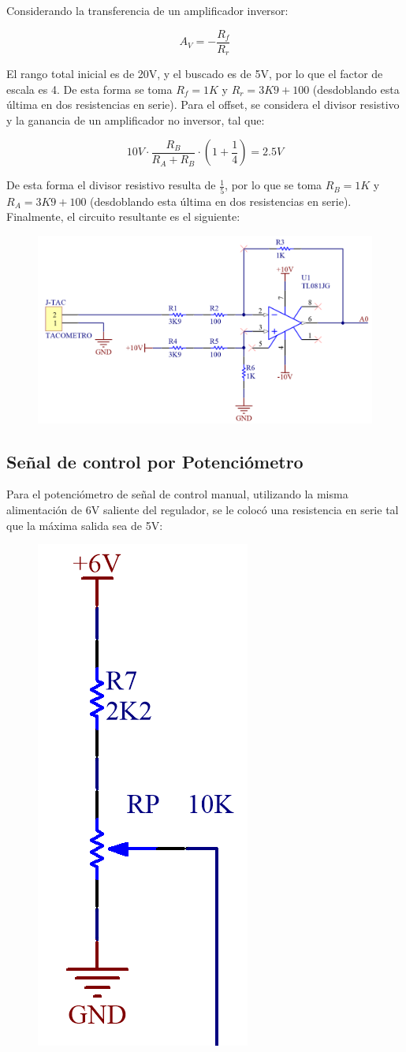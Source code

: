 \documentclass{article}
\begin{document}
Considerando la transferencia de un amplificador inversor:

\[
A_V = - \frac{R_f}{R_r}
\]

El rango total inicial es de 20V, y el buscado es de 5V, por lo que el factor de escala es 4. De esta forma se toma $R_f = 1K$ y $R_r = 3K9 + 100$ (desdoblando esta última en dos resistencias en serie). Para el offset, se considera el divisor resistivo y la ganancia de un amplificador no inversor, tal que:

\[
10V \cdot \frac{R_B}{R_A + R_B} \cdot \left(1 + \frac{1}{4}\right) = 2.5V
\]

De esta forma el divisor resistivo resulta de $\frac{1}{5}$, por lo que se toma $R_B = 1K$ y $R_A = 3K9 + 100$ (desdoblando esta última en dos resistencias en serie). Finalmente, el circuito resultante es el siguiente:

\begin{figure}[H]
\centering
\includegraphics[width=0.6\linewidth]{../Images/FuncionOpamp.png}
\end{figure}

\subsection{Señal de control por Potenciómetro}

Para el potenciómetro de señal de control manual, utilizando la misma alimentación de 6V saliente del regulador, se le colocó una resistencia en serie tal que la máxima salida sea de 5V:

\begin{figure}[H]
\centering
\includegraphics[width=0.1\linewidth]{../Images/PoteManual.png}
\end{figure}
\end{document}
